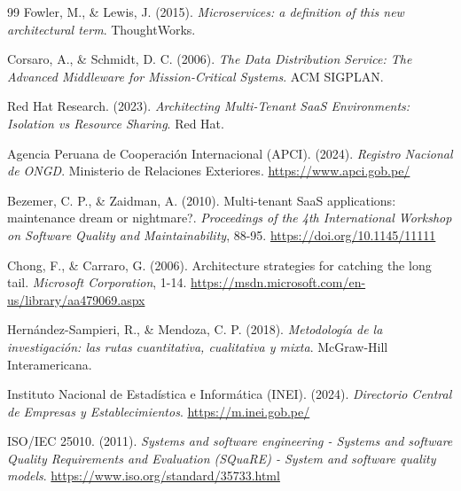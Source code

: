 \renewcommand{\bibname}{Referencias Bibliogr\'aficas}
\begin{thebibliography}{99}
Fowler, M., \& Lewis, J. (2015). \textit{Microservices: a definition of this new architectural term}. ThoughtWorks.

Corsaro, A., \& Schmidt, D. C. (2006). \textit{The Data Distribution Service: The Advanced Middleware for Mission-Critical Systems}. ACM SIGPLAN.

Red Hat Research. (2023). \textit{Architecting Multi-Tenant SaaS Environments: Isolation vs Resource Sharing}. Red Hat.

Agencia Peruana de Cooperaci\'on Internacional (APCI). (2024). \textit{Registro Nacional de ONGD}. Ministerio de Relaciones Exteriores. \url{https://www.apci.gob.pe/}

Bezemer, C. P., \& Zaidman, A. (2010). Multi-tenant SaaS applications: maintenance dream or nightmare?. \textit{Proceedings of the 4th International Workshop on Software Quality and Maintainability}, 88-95. \url{https://doi.org/10.1145/11111}

Chong, F., \& Carraro, G. (2006). Architecture strategies for catching the long tail. \textit{Microsoft Corporation}, 1-14. \url{https://msdn.microsoft.com/en-us/library/aa479069.aspx}

Hern\'andez-Sampieri, R., \& Mendoza, C. P. (2018). \textit{Metodolog\'ia de la investigaci\'on: las rutas cuantitativa, cualitativa y mixta}. McGraw-Hill Interamericana.

Instituto Nacional de Estad\'istica e Inform\'atica (INEI). (2024). \textit{Directorio Central de Empresas y Establecimientos}. \url{https://m.inei.gob.pe/}

ISO/IEC 25010. (2011). \textit{Systems and software engineering - Systems and software Quality Requirements and Evaluation (SQuaRE) - System and software quality models}. \url{https://www.iso.org/standard/35733.html}


\end{thebibliography}
